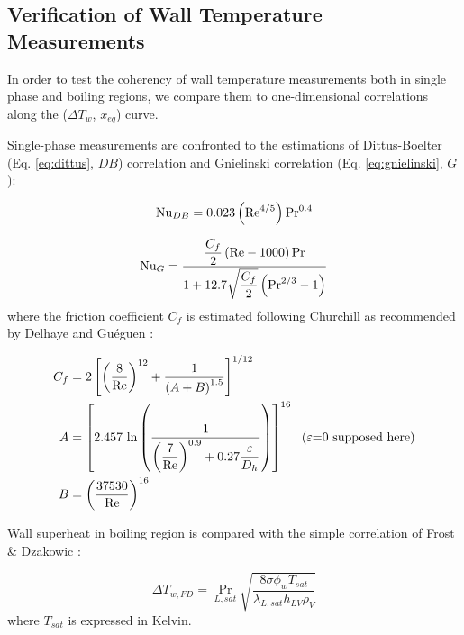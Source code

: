 \subsection{Verification of Wall Temperature Measurements}
\label{subsec:debora_Tw_verif}


In order to test the coherency of wall temperature measurements both in single phase and boiling regions, we compare them to one-dimensional correlations along the ($\Delta T_{w}$, $x_{eq}$) curve.

\npar

Single-phase measurements are confronted to the estimations of Dittus-Boelter (Eq. \ref{eq:dittus}, $DB$) correlation and Gnielinski correlation (Eq. \ref{eq:gnielinski}, $G$):

\begin{equation}
\mathrm{Nu}_{DB} = 0.023 \left( \mathrm{Re}^{4/5} \right) \mathrm{Pr}^{0.4}
\label{eq:dittus}
\end{equation}

\begin{equation}
\mathrm{Nu}_{G} = \frac{\dfrac{C_{f}}{2} \left( \mathrm{Re} - 1000 \right) \mathrm{Pr} }{1+12.7\sqrt{\dfrac{C_{f}}{2}} \left( \mathrm{Pr}^{2/3}-1 \right)}
\label{eq:gnielinski}
\end{equation}
where the friction coefficient $C_{f}$ is estimated following Churchill \cite{churchill_friction_1977} as recommended by Delhaye \cite{delhaye_thermohydraulique_2012} and Guéguen \cite{gueguen_contribution_2013}:

\begin{align}
C_{f} &= 2 \left[  \left( \frac{8}{\mathrm{Re}} \right)^{12} + \frac{1}{\left( A+B \right)^{1.5}}  \right]^{1/12} \\
\nonumber A &=\left[  2.457\ \mathrm{ln}\left(  \frac{1}{ \left( \dfrac{7}{\mathrm{Re}} \right)^{0.9} + 0.27 \dfrac{\varepsilon}{D_{h}} }  \right)  \right]^{16}\ \ \text{($\varepsilon$=0 supposed here)}\\
\nonumber B &= \left(  \frac{37530}{\mathrm{Re}}  \right)^{16}
\end{align}

\npar

Wall superheat in boiling region is compared with the simple correlation of Frost \& Dzakowic \cite{frost_extension_1967}:

\begin{equation}
\Delta T_{w,FD} = \Pr_{L,sat} \sqrt{\frac{8 \sigma \phi_{w} T_{sat}}{\lambda_{L,sat} h_{LV} \rho_{V}}} 
\label{eq:frost}
\end{equation}
where $T_{sat}$ is expressed in Kelvin.


\npar

